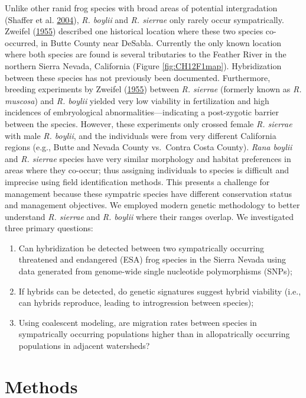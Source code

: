 \documentclass[proquest,12pt,final]{ucthesis-CA2012} %
\providecommand{\tightlist}{%
  \setlength{\itemsep}{0pt}\setlength{\parskip}{0pt}}
\begin{document}
\begin{ucmainmatter}
Unlike other ranid frog species with broad areas of potential
intergradation (Shaffer et al.
\protect\hyperlink{ref-shaffer_species_2004}{2004}), \emph{R. boylii}
and \emph{R. sierrae} only rarely occur sympatrically. Zweifel
(\protect\hyperlink{ref-zweifel_ecology_1955}{1955}) described one
historical location where these two species co-occurred, in Butte County
near DeSabla. Currently the only known location where both species are
found is several tributaries to the Feather River in the northern Sierra
Nevada, California (Figure \ref{fig:CH12F1map}). Hybridization between
these species has not previously been documented. Furthermore, breeding
experiments by Zweifel
(\protect\hyperlink{ref-zweifel_ecology_1955}{1955}) between \emph{R.
sierrae} (formerly known as \emph{R. muscosa}) and \emph{R. boylii}
yielded very low viability in fertilization and high incidences of
embryological abnormalities---indicating a post-zygotic barrier between
the species. However, these experiments only crossed female \emph{R.
sierrae} with male \emph{R. boylii}, and the individuals were from very
different California regions (e.g., Butte and Nevada County vs.~Contra
Costa County). \emph{Rana boylii} and \emph{R. sierrae} species have
very similar morphology and habitat preferences in areas where they
co-occur; thus assigning individuals to species is difficult and
imprecise using field identification methods. This presents a challenge
for management because these sympatric species have different
conservation status and management objectives. We employed modern
genetic methodology to better understand \emph{R. sierrae} and \emph{R.
boylii} where their ranges overlap. We investigated three primary
questions:
\begin{enumerate}
\def\labelenumi{\arabic{enumi}.}
\tightlist
\item
  Can hybridization be detected between two sympatrically occurring
  threatened and endangered (ESA) frog species in the Sierra Nevada
  using data generated from genome-wide single nucleotide polymorphisms
  (SNPs);
\item
  If hybrids can be detected, do genetic signatures suggest hybrid
  viability (i.e., can hybrids reproduce, leading to introgression
  between species);
\item
  Using coalescent modeling, are migration rates between species in
  sympatrically occurring populations higher than in allopatrically
  occurring populations in adjacent watersheds?
\end{enumerate}
\hypertarget{methods-1}{%
\section{Methods}\label{methods-1}}


\end{ucmainmatter}
\end{document}

